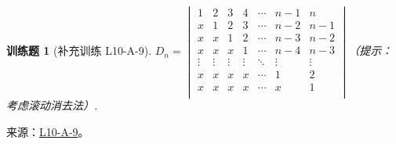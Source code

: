 \documentclass[12pt,fontset=fandol]{ctexart}
\newtheorem{exercise}{训练题}[section]
\begin{document}
\begin{exercise}[补充训练 L10-A-9]\label{prob:L10-A-9}
$ D_n=\begin{vmatrix}
                1      & 2      & 3      & 4      & \cdots & n-1    & n      \\
                x      & 1      & 2      & 3      & \cdots & n-2    & n-1    \\
                x      & x      & 1      & 2      & \cdots & n-3    & n-2    \\
                x      & x      & x      & 1      & \cdots & n-4    & n-3    \\
                \vdots & \vdots & \vdots & \vdots & \ddots & \vdots & \vdots \\
                x      & x      & x      & x      & \cdots & 1      & 2      \\
                x      & x      & x      & x      & \cdots & x      & 1      \\
            \end{vmatrix}$（提示：考虑滚动消去法）.
\end{exercise}
\noindent 来源：\href{https://github.com/yhwu-is/Linear-Algebra-Left-Undone/blob/new/%E8%AE%B2%E4%B9%89/%E4%B8%93%E9%A2%98/10%20%E8%A1%8C%E5%88%97%E5%BC%8F.tex}{L10-A-9}。
\end{document}
